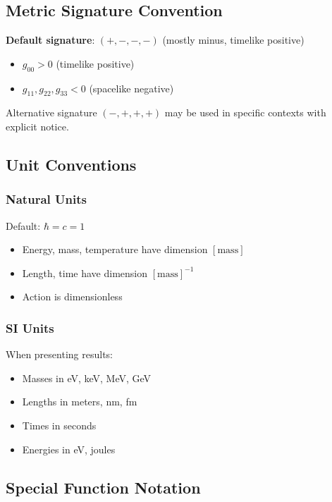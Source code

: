 \subsection{Metric Signature Convention}

\textbf{Default signature}: $(+, -, -, -)$ (mostly minus, timelike positive)

\begin{itemize}
    \item $g_{00} > 0$ (timelike positive)
    \item $g_{11}, g_{22}, g_{33} < 0$ (spacelike negative)
\end{itemize}

Alternative signature $(-, +, +, +)$ may be used in specific contexts with explicit notice.

\subsection{Unit Conventions}

\subsubsection{Natural Units}

Default: $\hbar = c = 1$

\begin{itemize}
    \item Energy, mass, temperature have dimension $[\text{mass}]$
    \item Length, time have dimension $[\text{mass}]^{-1}$
    \item Action is dimensionless
\end{itemize}

\subsubsection{SI Units}

When presenting results:
\begin{itemize}
    \item Masses in eV, keV, MeV, GeV
    \item Lengths in meters, nm, fm
    \item Times in seconds
    \item Energies in eV, joules
\end{itemize}

\subsection{Special Function Notation}

